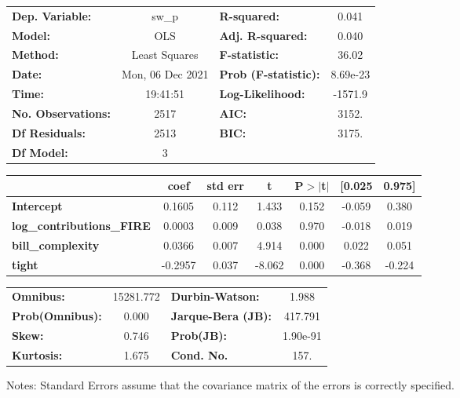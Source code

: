 \begin{center}
\begin{tabular}{lclc}
\toprule
\textbf{Dep. Variable:}           &      sw\_p       & \textbf{  R-squared:         } &     0.041   \\
\textbf{Model:}                   &       OLS        & \textbf{  Adj. R-squared:    } &     0.040   \\
\textbf{Method:}                  &  Least Squares   & \textbf{  F-statistic:       } &     36.02   \\
\textbf{Date:}                    & Mon, 06 Dec 2021 & \textbf{  Prob (F-statistic):} &  8.69e-23   \\
\textbf{Time:}                    &     19:41:51     & \textbf{  Log-Likelihood:    } &   -1571.9   \\
\textbf{No. Observations:}        &        2517      & \textbf{  AIC:               } &     3152.   \\
\textbf{Df Residuals:}            &        2513      & \textbf{  BIC:               } &     3175.   \\
\textbf{Df Model:}                &           3      & \textbf{                     } &             \\
\bottomrule
\end{tabular}
\begin{tabular}{lcccccc}
                                  & \textbf{coef} & \textbf{std err} & \textbf{t} & \textbf{P$> |$t$|$} & \textbf{[0.025} & \textbf{0.975]}  \\
\midrule
\textbf{Intercept}                &       0.1605  &        0.112     &     1.433  &         0.152        &       -0.059    &        0.380     \\
\textbf{log\_contributions\_FIRE} &       0.0003  &        0.009     &     0.038  &         0.970        &       -0.018    &        0.019     \\
\textbf{bill\_complexity}         &       0.0366  &        0.007     &     4.914  &         0.000        &        0.022    &        0.051     \\
\textbf{tight}                    &      -0.2957  &        0.037     &    -8.062  &         0.000        &       -0.368    &       -0.224     \\
\bottomrule
\end{tabular}
\begin{tabular}{lclc}
\textbf{Omnibus:}       & 15281.772 & \textbf{  Durbin-Watson:     } &    1.988  \\
\textbf{Prob(Omnibus):} &    0.000  & \textbf{  Jarque-Bera (JB):  } &  417.791  \\
\textbf{Skew:}          &    0.746  & \textbf{  Prob(JB):          } & 1.90e-91  \\
\textbf{Kurtosis:}      &    1.675  & \textbf{  Cond. No.          } &     157.  \\
\bottomrule
\end{tabular}
\end{center}

Notes: \newline
 [1] Standard Errors assume that the covariance matrix of the errors is correctly specified.